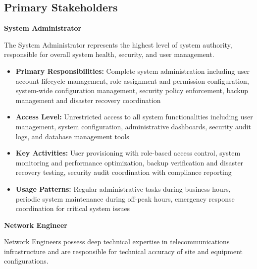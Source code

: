 \subsection{Primary Stakeholders}

\textbf{System Administrator}

The System Administrator represents the highest level of system authority, responsible for overall system health, security, and user management.

\begin{itemize}
\item \textbf{Primary Responsibilities:} Complete system administration including user account lifecycle management, role assignment and permission configuration, system-wide configuration management, security policy enforcement, backup management and disaster recovery coordination
\item \textbf{Access Level:} Unrestricted access to all system functionalities including user management, system configuration, administrative dashboards, security audit logs, and database management tools
\item \textbf{Key Activities:} User provisioning with role-based access control, system monitoring and performance optimization, backup verification and disaster recovery testing, security audit coordination with compliance reporting
\item \textbf{Usage Patterns:} Regular administrative tasks during business hours, periodic system maintenance during off-peak hours, emergency response coordination for critical system issues
\end{itemize}

\textbf{Network Engineer}

Network Engineers possess deep technical expertise in telecommunications infrastructure and are responsible for technical accuracy of site and equipment configurations.


